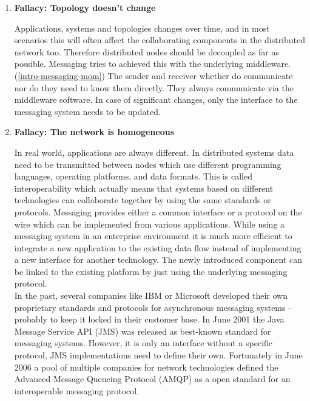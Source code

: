 \begin{enumerate}
{      }

    \item{\textbf{Fallacy: Topology doesn't change}

        Applications, systems and topologies changes over time, and in most
        scenarios this will often affect the collaborating components in the
        distributed network too. Therefore distributed nodes should be decoupled
        as far as possible. Messaging tries to achieved this with the underlying
        middleware.(\ref{intro-messaging-mom}) The sender and receiver whether
        do communicate nor do they need to know them directly. They always
        communicate via the middleware software. In case of significant changes,
        only the interface to the messaging system needs to be updated.

      }

    \item{\textbf{Fallacy: The network is homogeneous}

        In real world, applications are always different. In distributed systems
        data need to be transmitted between nodes which use different
        programming languages, operating platforms, and data formats.  This is
        called interoperability which actually means that systems based on
        different technologies can collaborate together by using the same
        standards or protocols. Messaging provides either a common interface or
        a protocol on the wire which can be implemented from various
        applications. While using a messaging system in an enterprise
        environment it is much more efficient to integrate a new application to
        the existing data flow instead of implementing a new interface for
        another technology. The newly introduced component can be linked to the
        existing platform by just using the underlying messaging protocol.\\

        In the past, several companies like IBM or Microsoft developed their own
        proprietary standards and protocols for asynchronous messaging systems
        -- probably to keep it locked in their customer base. In June 2001 the
        Java Message Service API (JMS) was released as best-known standard for
        messaging systems. However, it is only an interface without a specific
        protocol, JMS implementations need to define their own. Fortunately in
        June 2006 a pool of multiple companies for network technologies defined
        the Advanced Message Queueing Protocol (AMQP) as a open standard for an
        interoperable messaging protocol. \cite{PrpAMQP}

    }

\end{enumerate} \cite{EIP03}\cite{fallacies}


